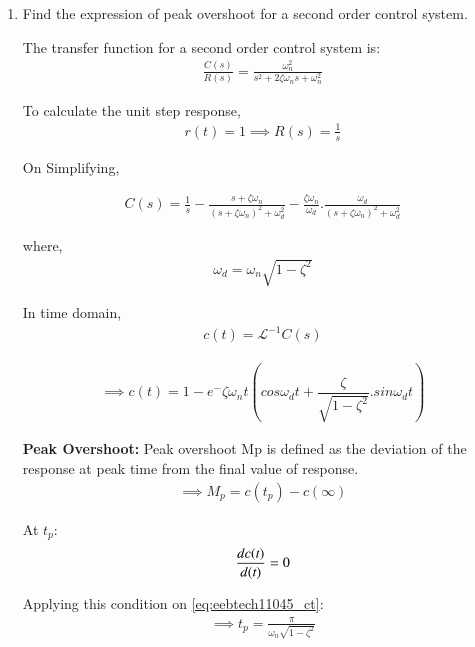 \begin{enumerate}[label=\thesubsection.\arabic*.,ref=\thesubsection.\theenumi]

\item Find the expression of peak overshoot for a second order control system.

\solution

The transfer function for a second order control system is:
\begin{align}
    \frac{C(s)}{R(s)}= \frac{\omega_n^2}{s^2 + 2\zeta\omega_ns + \omega_n^2}
\end{align}

To calculate the unit step response,
\begin{align}
    r(t) = 1 \implies R(s) = \frac{1}{s}    
\end{align}

On Simplifying, 

\begin{align}
    C(s) = \frac{1}{s}-\frac{s+\zeta\omega_n}{(s + \zeta\omega_n)^2 + \omega_d^2} - \frac{\zeta\omega_n}{\omega_d}.\frac{\omega_d}{(s + \zeta\omega_n)^2 + \omega_d^2}  
\end{align}

where, 
\begin{align}
    \omega_d=\omega_n\sqrt{1-\zeta^2}
\end{align}

In time domain, 
\begin{align}
    c(t) = \mathcal{L}^{-1}{C(s)}
\end{align}

\begin{align}
    \implies
    c(t) = 1 - e^-\zeta\omega_nt(cos\omega_dt+\dfrac{\zeta}{\sqrt{1-\zeta^2}}.sin\omega_dt)
    \label{eq:eebtech11045_ct}
\end{align}

 \textbf{Peak Overshoot:}
Peak overshoot Mp is defined as the deviation of the response at peak time from the final value of response.
\begin{align}
    \implies M_p = c(t_p) - c(\infty)
    \label{eq:eebtech11045_Mp}
\end{align}

At $t_p$:
\begin{align}
    \frac{dc(\emph{t})}{d(\emph{t})} = 0
\end{align}

Applying this condition on \eqref{eq:eebtech11045_ct}:
\begin{align}
    \implies t_p = \frac{\pi}{\omega_n\sqrt{1-\zeta^2}}
\end{align}


\end{enumerate}
